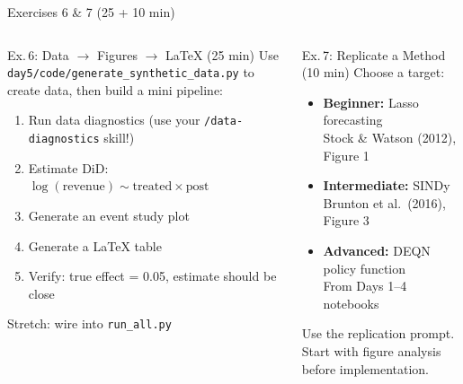 \documentclass[aspectratio=169,10pt]{beamer}
\begin{document}
\begin{frame}[fragile]{Exercises 6 \& 7 {\small(25 + 10 min)}}
\begin{columns}[T]
\begin{exampleblock}{Ex.\,6: Data $\to$ Figures $\to$ LaTeX (25 min)}
\small
Use \texttt{day5/code/generate\_synthetic\_data.py} to create data, then build a mini pipeline:
\begin{enumerate}\itemsep0pt
    \item Run data diagnostics (use your \texttt{/data-diagnostics} skill!)
    \item Estimate DiD: $\log(\text{revenue}) \sim \text{treated} \times \text{post}$
    \item Generate an event study plot
    \item Generate a LaTeX table
    \item Verify: true effect = 0.05, estimate should be close
\end{enumerate}

{\scriptsize Stretch: wire into \texttt{run\_all.py}}
\end{exampleblock}

\begin{exampleblock}{Ex.\,7: Replicate a Method (10 min)}
\small
Choose a target:
\begin{itemize}\itemsep0pt
    \item \textbf{Beginner:} Lasso forecasting\\[-2pt]
    {\scriptsize Stock \& Watson (2012), Figure 1}
    \item \textbf{Intermediate:} SINDy\\[-2pt]
    {\scriptsize Brunton et al.\ (2016), Figure 3}
    \item \textbf{Advanced:} DEQN policy function\\[-2pt]
    {\scriptsize From Days 1--4 notebooks}
\end{itemize}

\vspace{0.2em}
Use the replication prompt. Start with figure analysis before implementation.
\end{exampleblock}
\end{columns}
\end{frame}

\end{document}
